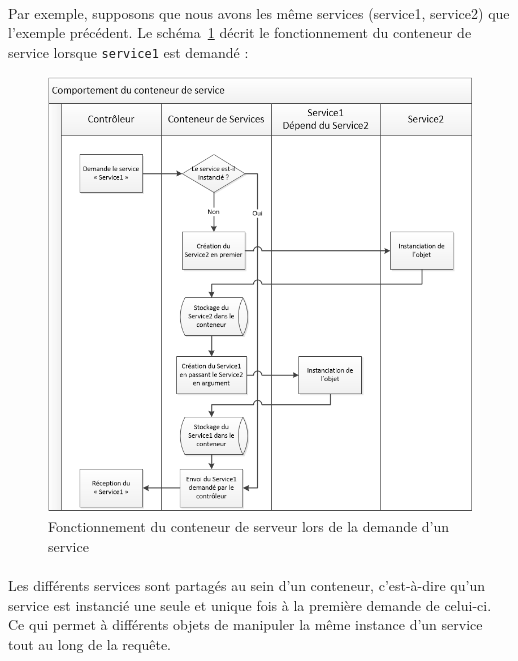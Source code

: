 \paragraph{}
Par exemple, supposons que nous avons les même services (service1, service2) que l'exemple précédent. Le schéma~\ref{conteneur} décrit le fonctionnement du conteneur de service lorsque \verb?service1? est demandé :
		\begin{figure}[H]
        \begin{center}
          \includegraphics[scale=0.8]{images/conteneur_service}
        \end{center}
        \caption{Fonctionnement du conteneur de serveur lors de la demande d'un service}
        \label{conteneur}
      \end{figure}

\paragraph{}
Les différents services sont partagés au sein d'un conteneur, c'est-à-dire qu'un service est instancié une seule et unique fois à la première demande de celui-ci. Ce qui permet à différents objets de manipuler la même instance d'un service tout au long de la requête.
